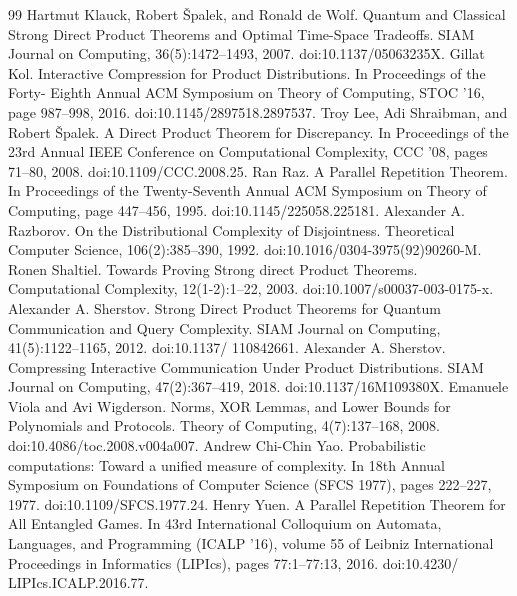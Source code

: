\documentclass[10pt,a4paper]{article}
\begin{document}
\begin{thebibliography}{99}
 Hartmut Klauck, Robert Špalek, and Ronald de Wolf. Quantum and Classical Strong Direct Product Theorems and Optimal Time-Space Tradeoffs. SIAM Journal on Computing, 36(5):1472–1493, 2007. doi:10.1137/05063235X.
 Gillat Kol. Interactive Compression for Product Distributions. In Proceedings of the Forty- Eighth Annual ACM Symposium on Theory of Computing, STOC ’16, page 987–998, 2016. doi:10.1145/2897518.2897537.
 Troy Lee, Adi Shraibman, and Robert Špalek. A Direct Product Theorem for Discrepancy. In Proceedings of the 23rd Annual IEEE Conference on Computational Complexity, CCC ’08, pages 71–80, 2008. doi:10.1109/CCC.2008.25.
 Ran Raz. A Parallel Repetition Theorem. In Proceedings of the Twenty-Seventh Annual ACM Symposium on Theory of Computing, page 447–456, 1995. doi:10.1145/225058.225181.
 Alexander A. Razborov. On the Distributional Complexity of Disjointness. Theoretical Computer Science, 106(2):385–390, 1992. doi:10.1016/0304-3975(92)90260-M.
 Ronen Shaltiel. Towards Proving Strong direct Product Theorems. Computational Complexity, 12(1-2):1–22, 2003. doi:10.1007/s00037-003-0175-x.
 Alexander A. Sherstov. Strong Direct Product Theorems for Quantum Communication and Query Complexity. SIAM Journal on Computing, 41(5):1122–1165, 2012. doi:10.1137/ 110842661.
 Alexander A. Sherstov. Compressing Interactive Communication Under Product Distributions. SIAM Journal on Computing, 47(2):367–419, 2018. doi:10.1137/16M109380X.
 Emanuele Viola and Avi Wigderson. Norms, XOR Lemmas, and Lower Bounds for Polynomials and Protocols. Theory of Computing, 4(7):137–168, 2008. doi:10.4086/toc.2008.v004a007.
 Andrew Chi-Chin Yao. Probabilistic computations: Toward a unified measure of complexity. In 18th Annual Symposium on Foundations of Computer Science (SFCS 1977), pages 222–227, 1977. doi:10.1109/SFCS.1977.24.
 Henry Yuen. A Parallel Repetition Theorem for All Entangled Games. In 43rd International Colloquium on Automata, Languages, and Programming (ICALP ’16), volume 55 of Leibniz International Proceedings in Informatics (LIPIcs), pages 77:1–77:13, 2016. doi:10.4230/ LIPIcs.ICALP.2016.77.
\end{thebibliography}
\end{document}
